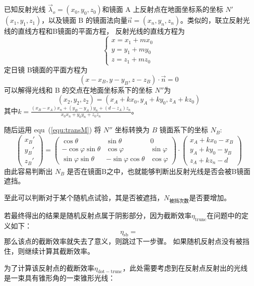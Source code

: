 \documentclass[../main.tex]{subfiles}
\begin{document}
已知反射光线 \(\vec \lambda _{o} = (x_0,y_0,z_0)\)和镜面 A 上反射点在地面坐标系的坐标 \(N'\)\((x_1, y_1, z_1)\)，以及镜面 B 的镜面法向量\(\vec n = (x_{n} , y_{n} ,z_{n})\)。类似的，联立反射光线的直线方程和B镜面的平面方程，
反射光线的直线方程为
\[
\begin{cases}
x = x_1 + m x_0\\
y = y_1 + m y_0\\
z = z_1 + m z_0
\end{cases}
\]
定日镜 B镜面的平面方程为
\[
(x - x_{B} , y - y_{B} , z-z_{B}) \cdot \vec n = 0
\]
可以解得光线和 B 的交点在地面坐标系下的坐标 \(N''\)为
\[
(x_2 , y_2, z_2) = (x_{A} + k x_0, y_{A} + ky_{0} , z_{A} + kz_{0})
\]
其中\(k = \displaystyle \frac{(x_{B} - x_{A}) x_{n} + (y_{B} - y_{A}) y_{n} + (d- z_{A}) z_{n}}{x_0 x_{n} + y_{0} y_{n} + z_{0} z _{n}}\)。

随后运用 equ~(\ref{equ:transM}) 将 \(N''\) 坐标转换为 \(B\) 镜面系下的坐标 \(N_{B}\):
\[
\begin{pmatrix}
x_{B} '\\
y_{B} '\\
z _{B} '
\end{pmatrix}
=
\begin{pmatrix}
\cos \theta & \sin \theta & 0\\
-\cos \varphi \sin \theta & \cos \varphi & \sin \varphi \\
\sin \varphi \sin \theta & - \sin \varphi \cos \theta & \cos \varphi
\end{pmatrix}
\cdot
\begin{pmatrix}
x_{A} + kx_0 - x_{B}\\
y_{A} + ky_{0} - y_{B}\\
z_{A} + kz_{n} - d
\end{pmatrix}
\]
由此容易判断出 \(N_{B}\) 是否在镜面B之中，也就能够判断出反射光线是否会被B镜面遮挡。

至此可以判断对于某个随机点试验，其是否被遮挡，\(N_{\text{被挡次数}}\)是否要增加。

若最终得出的结果是随机反射点属于阴影部分，因为截断效率\(\eta _{\mathrm{trunc}}\)在问题中的定义如下：
\begin{equation}
\eta _{\mathrm{s b}} =
\end{equation}
那么该点的截断效率就失去了意义，则跳过下一步骤。
如果随机反射点没有被挡住，则继续计算其截断效率。

为了计算该反射点的截断效率\(\eta _{\mathrm{dot}{-}\mathrm{trunc}}\)，此处需要考虑到在反射点反射出的光线是一束具有锥形角的一束锥形光线：
\end{document}
